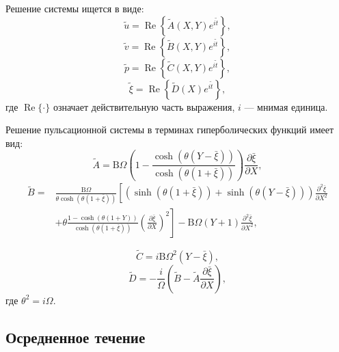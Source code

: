 \documentclass[12pt,a4paper]{article}
\begin{document}
Решение системы ищется в виде:
\[
	\tilde{u} = \operatorname{Re}\left\{ \tilde{A}(X, Y) e^{i \tilde{t}} \right\},
\]
\[
	\tilde{v} = \operatorname{Re}\left\{ \tilde{B}(X, Y) e^{i \tilde{t}} \right\},
\]
\[
	\tilde{p} = \operatorname{Re}\left\{ \tilde{C}(X, Y) e^{i \tilde{t}} \right\},
\]
\[
	\tilde{\xi} = \operatorname{Re}\left\{ \tilde{D}(X) e^{i \tilde{t}} \right\},
\]
где $\operatorname{Re}\{\cdot\}$ означает действительную часть выражения, $i$ — мнимая единица.

Решение пульсационной системы в терминах гиперболических функций имеет вид:
\begin{equation}
	\tilde{A} = \mathrm{B} \Omega \left(1- \frac{\cosh\left(\theta(Y - \bar{\xi})\right)}{\cosh\left(\theta(1 + \bar{\xi})\right)} \right) \frac{\partial \bar{\xi}}{\partial {X}},
\end{equation}
\begin{equation}
	\begin{aligned}
		\tilde{B} = {} & \frac{\mathrm{B} \Omega}{\theta \cosh\left(\theta(1 + \bar{\xi})\right)} \left[ \left( \sinh\left(\theta(1 + \bar{\xi})\right) + \sinh\left(\theta(Y - \bar{\xi})\right) \right) \frac{\partial^2 \bar{\xi}}{\partial {X}^2} \right. \\
		& \left. + \theta \frac{1 - \cosh\left(\theta(1 + Y)\right)}{\cosh\left(\theta(1 + \bar{\xi})\right)} \left( \frac{\partial \bar{\xi}}{\partial {X}} \right)^2\right] - \mathrm{B} \Omega (Y + 1) \frac{\partial^2 \bar{\xi}}{\partial {X}^2} ,
	\end{aligned}
\end{equation}

\begin{equation}
	\tilde{C} = i \mathrm{B} \Omega^2 (Y - \bar{\xi}),
\end{equation}
\begin{equation}
	\tilde{D} = -\frac{i}{\Omega} \left( \tilde{B} - \tilde{A} \frac{\partial \bar{\xi}}{\partial X} \right),
\end{equation}
где $\theta^2 = i \Omega$.


\subsection{Осредненное течение}
\end{document}
